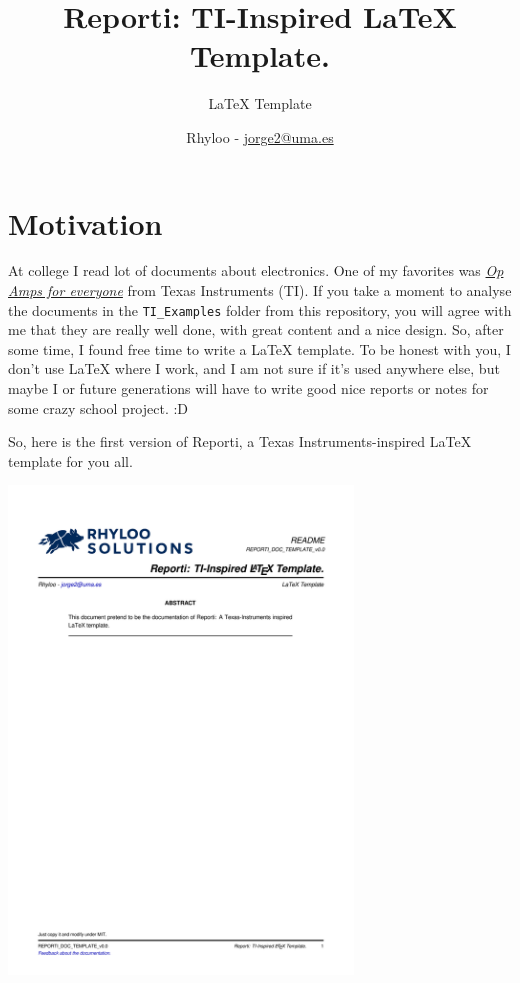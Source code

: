 \documentclass[english]{reporti}
\date{}
\title{Reporti: TI-Inspired \LaTeX{} Template.}
\begin{document}
\subtitle{LaTeX Template}
\author{Rhyloo - \href{mailto:jorge2@uma.es}{jorge2@uma.es}}




\cover[width=1.35\textwidth][next]

\section{Motivation}
\label{sec:orgd84f760}
At college I read lot of documents about electronics. One of my favorites was \emph{\href{https://e2echina.ti.com/cfs-file/\_\_key/telligent-evolution-components-attachments/00-52-01-00-00-04-59-46/OP-amp-for-everyone.pdf}{Op Amps for everyone}} from Texas Instruments (TI). If you take a moment to analyse the documents in the \texttt{TI\_Examples} folder from this repository, you will agree with me that they are really well done, with great content and a nice design. So, after some time, I found free time to write a \LaTeX{} template. To be honest with you, I don't use \LaTeX{} where I work, and I am not sure if it's used anywhere else, but maybe I or future generations will have to write good nice reports or notes for some crazy school project. :D

So, here is the first version of Reporti, a Texas Instruments-inspired \LaTeX{} template for you all.

\begin{center}
\includegraphics[fbox,height=35em]{./README.pdf}
\end{center}
\end{document}
